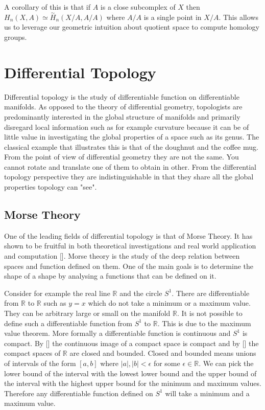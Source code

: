 A corollary of this is that if $A$ is a close subcomplex of $X$ then $H_n(X, A) \simeq \overset{\sim}{H}_n(X/A, A/A)$ where $A/A$ is a single point in $X/A$. This allows us to leverage our geometric intuition about quotient space to compute homology groups.



\section{Differential Topology}

Differential topology is the study of differentiable function on differentiable manifolds. As opposed to the theory of differential geometry, topologists are predominantly interested in the global structure of manifolds and primarily disregard local information such as for example curvature because it can be of little value in investigating the global properties of a space such as its genus. The classical example that illustrates this is that of the doughnut and the coffee mug. From the point of view of differential geometry they are not the same. You cannot rotate and translate one of them to obtain in other. From the differential topology perspective they are indistinguishable in that they share all the global properties topology can "see".   

\subsection{Morse Theory}

One of the leading fields of differential topology is that of Morse Theory. It has shown to be fruitful in both theoretical investigations and real world application and computation []. Morse theory is the study of the deep relation between spaces and function defined on them. One of the main goals is to determine the shape of a shape by analysing a functions that can be defined on it. 

Consider for example the real line $\mathbb{R}$ and the circle $S^1$. There are differentiable from $\mathbb{R}$ to $\mathbb{R}$ such as $y = x$ which do not take a minimum or a maximum value. They can be arbitrary large or small on the manifold $\mathbb{R}$. It is not possible to define such a differentiable function from $S^1$ to $\mathbb{R}$. This is due to the maximum value theorem. More formally a differentiable function is continuous and $S^1$ is compact. By [] the continuous image of a compact space is compact and by [] the compact spaces of $\mathbb{R}$ are closed and bounded. Closed and bounded means unions of intervals of the form $[a, b]$ where $|a|, |b| < \epsilon$ for some $\epsilon \in \mathbb{R}$. We can pick the lower bound of the interval with the lowest lower bound and the upper bound of the interval with the highest upper bound for the minimum and maximum values. Therefore any differentiable function defined on $S^1$ will take a minimum and a maximum value.

